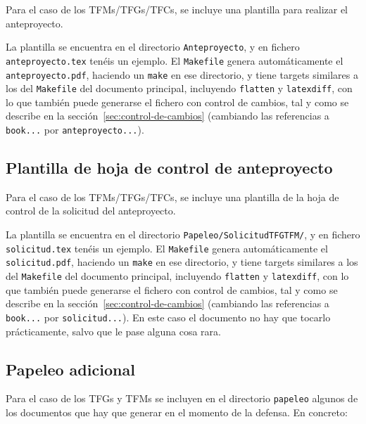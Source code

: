 Para el caso de los TFMs/TFGs/TFCs, se incluye una plantilla para
realizar el anteproyecto.

La plantilla se encuentra en el directorio \texttt{Anteproyecto}, y en
fichero \texttt{anteproyecto.tex} tenéis un ejemplo. El
\texttt{Makefile} genera automáticamente el \texttt{anteproyecto.pdf},
haciendo un \texttt{make} en ese directorio, y tiene targets similares a los
del \texttt{Makefile} del documento principal, incluyendo
\texttt{flatten} y \texttt{latexdiff}, con lo que también puede
generarse el fichero con control de cambios, tal y como se describe en
la sección~\ref{sec:control-de-cambios} (cambiando las referencias a
\texttt{book...} por \texttt{anteproyecto...}).

\subsection{Plantilla de hoja de control de anteproyecto}
\label{sec:plantilla-de-hoja-control-anteproyecto}

Para el caso de los TFMs/TFGs/TFCs, se incluye una plantilla de la hoja
de control de la solicitud del anteproyecto.

La plantilla se encuentra en el directorio \texttt{Papeleo/SolicitudTFGTFM/}, y en
fichero \texttt{solicitud.tex} tenéis un ejemplo. El
\texttt{Makefile} genera automáticamente el \texttt{solicitud.pdf},
haciendo un \texttt{make} en ese directorio, y tiene targets similares a los
del \texttt{Makefile} del documento principal, incluyendo
\texttt{flatten} y \texttt{latexdiff}, con lo que también puede
generarse el fichero con control de cambios, tal y como se describe en
la sección~\ref{sec:control-de-cambios} (cambiando las referencias a
\texttt{book...} por \texttt{solicitud...}). En este caso el documento
no hay que tocarlo prácticamente, salvo que le pase alguna cosa rara.


\subsection{Papeleo adicional}
\label{sec:introapp1}

Para el caso de los TFGs y TFMs se incluyen en el directorio
\texttt{papeleo} algunos de los documentos que hay que generar en el
momento de la defensa. En concreto:

